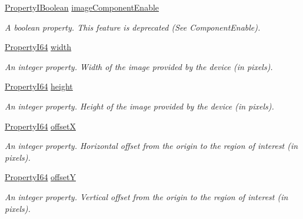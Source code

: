 \begin{DoxyCompactItemize}
\hyperlink{group___common_interface_ga44f9437e24b21b6c93da9039ec6786aa}{Property\+I\+Boolean} \hyperlink{classmv_i_m_p_a_c_t_1_1acquire_1_1_gen_i_cam_1_1_image_format_control_abb89d1bfa99e26551bb92e842195d2f8}{image\+Component\+Enable}
\begin{DoxyCompactList}\small\item\em A boolean property. This feature is deprecated (See Component\+Enable). \end{DoxyCompactList}\item 
\hyperlink{group___common_interface_ga81749b2696755513663492664a18a893}{Property\+I64} \hyperlink{classmv_i_m_p_a_c_t_1_1acquire_1_1_gen_i_cam_1_1_image_format_control_a26c77884743e27837dda64cc08d9266c}{width}
\begin{DoxyCompactList}\small\item\em An integer property. Width of the image provided by the device (in pixels). \end{DoxyCompactList}\item 
\hyperlink{group___common_interface_ga81749b2696755513663492664a18a893}{Property\+I64} \hyperlink{classmv_i_m_p_a_c_t_1_1acquire_1_1_gen_i_cam_1_1_image_format_control_a5e3f3b5d6644aa765cce4f52b872a5c3}{height}
\begin{DoxyCompactList}\small\item\em An integer property. Height of the image provided by the device (in pixels). \end{DoxyCompactList}\item 
\hyperlink{group___common_interface_ga81749b2696755513663492664a18a893}{Property\+I64} \hyperlink{classmv_i_m_p_a_c_t_1_1acquire_1_1_gen_i_cam_1_1_image_format_control_ae60f5a436f0da44d0afa63e489c56bea}{offset\+X}
\begin{DoxyCompactList}\small\item\em An integer property. Horizontal offset from the origin to the region of interest (in pixels). \end{DoxyCompactList}\item 
\hyperlink{group___common_interface_ga81749b2696755513663492664a18a893}{Property\+I64} \hyperlink{classmv_i_m_p_a_c_t_1_1acquire_1_1_gen_i_cam_1_1_image_format_control_af37364805be675d07c59be811b50cda3}{offset\+Y}
\begin{DoxyCompactList}\small\item\em An integer property. Vertical offset from the origin to the region of interest (in pixels). \end{DoxyCompactList}\item 

\end{DoxyCompactItemize}
